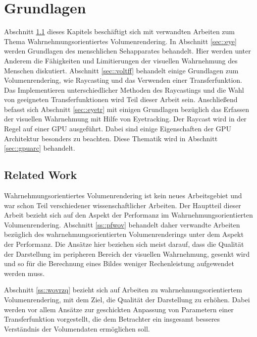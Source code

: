 
\chapter{Grundlagen}\label{chap::basics}
\label{chap:k2}
Abschnitt \ref{sec::relwo} dieses Kapitels beschäftigt sich mit verwandten Arbeiten zum Thema Wahrnehmungsorientiertes Volumenrendering.
In Abschnitt \ref{sec::eye} werden Grundlagen des menschlichen Sehapparates behandelt.
Hier werden unter Anderem die Fähigkeiten und Limitierungen der visuellen Wahrnehmung des Menschen diskutiert.
Abschnitt \ref{sec::voltff} behandelt einige Grundlagen zum Volumenrendering, wie Raycasting und das Verwenden einer Transferfunktion.
Das Implementieren unterschiedlicher Methoden des Raycastings und die Wahl von geeigneten Transferfunktionen wird Teil dieser Arbeit sein.
Anschließend befasst sich Abschnitt \ref{sec::eyetr} mit einigen Grundlagen bezüglich das Erfassen der visuellen Wahrnehmung mit Hilfe von Eyetracking.
Der Raycast wird in der Regel auf einer GPU ausgeführt.
Dabei sind einige Eigenschaften der GPU Architektur besonders zu beachten.
Diese Thematik wird in Abschnitt \ref{sec::gpuarc} behandelt.

\section{Related Work}\label{sec::relwo}
Wahrnehmungsorientiertes Volumenrendering ist kein neues Arbeitsgebiet und war schon Teil verschiedener wissenschaftlicher Arbeiten.
Der Hauptteil dieser Arbeit bezieht sich auf den Aspekt der Performanz im Wahrnehmungsorientierten Volumenrendering.
Abschnitt \ref{ss::pfwov} behandelt daher verwandte Arbeiten bezüglich des wahrnehmungsorientierten Volumenrenderings unter dem Aspekt der Performanz.
Die Ansätze hier beziehen sich meist darauf, dass die Qualität der Darstellung im peripheren Bereich der visuellen Wahrnehmung, gesenkt wird und so für die Berechnung eines Bildes weniger Rechenleistung aufgewendet werden muss.

Abschnitt \ref{ss::wovrzq} bezieht sich auf Arbeiten zu wahrnehmungsorientiertem Volumenrendering, mit dem Ziel, die Qualität der Darstellung zu erhöhen.
Dabei werden vor allem Ansätze zur geschickten Anpassung von Parametern einer Transferfunktion vorgestellt, die dem Betrachter ein insgesamt besseres Verständnis der Volumendaten ermöglichen soll.
